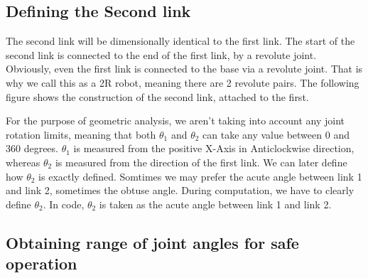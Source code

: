 \documentclass[12pt]{article}
\begin{document}
\subsection{Defining the Second link}
The second link will be dimensionally identical to the first link. The start of the second link is connected to the end of the first link, by a revolute joint. Obviously, even the first link is connected to the base via a revolute joint. That is why we call this as a 2R robot, meaning there are 2 revolute pairs. The following figure shows the construction of the second link, attached to the first.
\begin{center}
\end{center}
For the purpose of geometric analysis, we aren't taking into account any joint rotation limits, meaning that both $\theta_1$ and $\theta_2$ can take any value between 0 and 360 degrees. $\theta_1$ is measured from the positive X-Axis in Anticlockwise direction, whereas $\theta_2$ is measured from the direction of the first link. We can later define how $\theta_2$ is exactly defined. Somtimes we may prefer the acute angle between link 1 and link 2, sometimes the obtuse angle. During computation, we have to clearly define $\theta_2$. In code, $\theta_2$ is taken as the acute angle between link 1 and link 2.
\clearpage
\subsection{Obtaining range of joint angles for safe operation}
\end{document}
